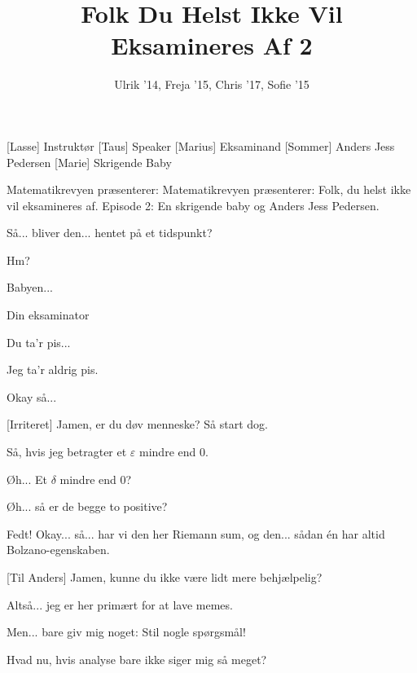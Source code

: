 \documentclass[a4paper,11pt]{article}
\title{Folk Du Helst Ikke Vil Eksamineres Af 2}
\author{Ulrik '14, Freja '15, Chris '17, Sofie '15}
\begin{document}
\maketitle

\begin{roles}
[Lasse] Instruktør
[Taus] Speaker
[Marius] Eksaminand
[Sommer] Anders Jess Pedersen
[Marie] Skrigende Baby
\end{roles}

\begin{props}
\end{props}

\begin{sketch}
 Matematikrevyen præsenterer: Matematikrevyen præsenterer: Folk, du helst ikke vil eksamineres af. Episode 2: En skrigende baby og Anders Jess Pedersen.



 Så... bliver den... hentet på et tidspunkt?


 Hm?

 Babyen...

 Din eksaminator

 Du ta'r pis...

 Jeg ta'r aldrig pis.


 Okay så...

[Irriteret] Jamen, er du døv menneske? Så start dog.


 Så, hvis jeg betragter et $\varepsilon$ mindre end 0.


 Øh... Et $\delta$ mindre end 0?


 Øh... så er de begge to positive?


 Fedt! Okay... så... har vi den her Riemann sum, og den... sådan én har altid Bolzano-egenskaben.


[Til Anders] Jamen, kunne du ikke være lidt mere behjælpelig?

 Altså... jeg er her primært for at lave memes.

 Men... bare giv mig noget: Stil nogle spørgsmål!

 Hvad nu, hvis analyse bare ikke siger mig så meget?

\end{sketch}
\end{document}
